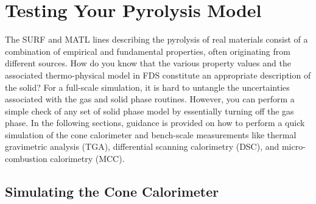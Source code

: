 \documentclass[11pt]{book}
\begin{document}
\section{Testing Your Pyrolysis Model}
\label{solid_phase_verification}

The {\ct SURF} and {\ct MATL} lines describing the pyrolysis of real materials consist of a combination of empirical and fundamental properties, often originating from different sources. How do you know that the various property values and the associated thermo-physical model in FDS constitute an appropriate description of the solid? For a full-scale simulation, it is hard to untangle the uncertainties associated with the gas and solid phase routines. However, you can perform a simple check of any set of solid phase model by essentially turning off the gas phase.  In the following sections, guidance is provided on how to perform a quick simulation of the cone calorimeter and bench-scale measurements like thermal gravimetric analysis (TGA), differential scanning calorimetry (DSC), and micro-combustion calorimetry (MCC).

\subsection{Simulating the Cone Calorimeter}
\end{document}

